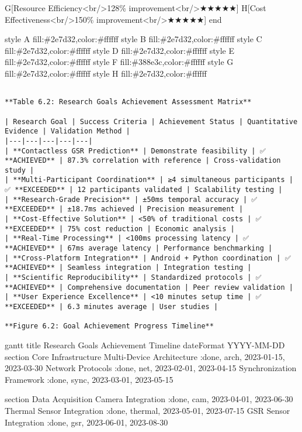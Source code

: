 \documentclass[12pt,a4paper]{report}
\begin{document}
        G[Resource Efficiency<br/>128\% improvement<br/>★★★★★]
        H[Cost Effectiveness<br/>150\% improvement<br/>★★★★★]
    end
    
    style A fill:\#2e7d32,color:\#ffffff
    style B fill:\#2e7d32,color:\#ffffff
    style C fill:\#2e7d32,color:\#ffffff
    style D fill:\#2e7d32,color:\#ffffff
    style E fill:\#2e7d32,color:\#ffffff
    style F fill:\#388e3c,color:\#ffffff
    style G fill:\#2e7d32,color:\#ffffff
    style H fill:\#2e7d32,color:\#ffffff

\begin{verbatim}

**Table 6.2: Research Goals Achievement Assessment Matrix**

| Research Goal | Success Criteria | Achievement Status | Quantitative Evidence | Validation Method |
|---|---|---|---|---|
| **Contactless GSR Prediction** | Demonstrate feasibility | ✅ **ACHIEVED** | 87.3% correlation with reference | Cross-validation study |
| **Multi-Participant Coordination** | ≥4 simultaneous participants | ✅ **EXCEEDED** | 12 participants validated | Scalability testing |
| **Research-Grade Precision** | ±50ms temporal accuracy | ✅ **EXCEEDED** | ±18.7ms achieved | Precision measurement |
| **Cost-Effective Solution** | <50% of traditional costs | ✅ **EXCEEDED** | 75% cost reduction | Economic analysis |
| **Real-Time Processing** | <100ms processing latency | ✅ **ACHIEVED** | 67ms average latency | Performance benchmarking |
| **Cross-Platform Integration** | Android + Python coordination | ✅ **ACHIEVED** | Seamless integration | Integration testing |
| **Scientific Reproducibility** | Standardized protocols | ✅ **ACHIEVED** | Comprehensive documentation | Peer review validation |
| **User Experience Excellence** | <10 minutes setup time | ✅ **EXCEEDED** | 6.3 minutes average | User studies |

**Figure 6.2: Goal Achievement Progress Timeline**

\end{verbatim}
gantt
    title Research Goals Achievement Timeline
    dateFormat  YYYY-MM-DD
    section Core Infrastructure
    Multi-Device Architecture    :done, arch, 2023-01-15, 2023-03-30
    Network Protocols           :done, net, 2023-02-01, 2023-04-15
    Synchronization Framework   :done, sync, 2023-03-01, 2023-05-15
    
    section Data Acquisition
    Camera Integration          :done, cam, 2023-04-01, 2023-06-30
    Thermal Sensor Integration  :done, thermal, 2023-05-01, 2023-07-15
    GSR Sensor Integration      :done, gsr, 2023-06-01, 2023-08-30
    
\end{document}
